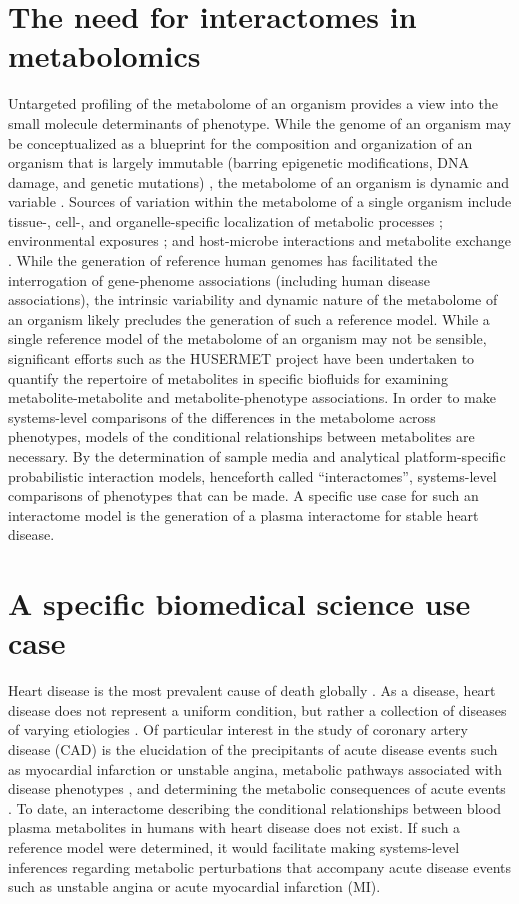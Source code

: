 \section{The need for interactomes in metabolomics}
Untargeted profiling of the metabolome of an organism provides a view into the small molecule determinants of phenotype. While the genome of an organism may be conceptualized as a blueprint for the composition and organization of an organism that is largely immutable (barring epigenetic modifications, DNA damage, and genetic mutations) \cite{gao2015,keating2015,martincorena2015}, the metabolome of an organism is dynamic and variable \cite{dallmann2012,krycer2017}. Sources of variation within the metabolome of a single organism include tissue-, cell-, and organelle-specific localization of metabolic processes \cite{shlomi2008,voet2013}; environmental exposures \cite{southam2014}; and host-microbe interactions and metabolite exchange \cite{moriya2017}. While the generation of reference human genomes has facilitated the interrogation of gene-phenome associations (including human disease associations), the intrinsic variability and dynamic nature of the metabolome of an organism likely precludes the generation of such a reference model. While a single reference model of the metabolome of an organism may not be sensible, significant efforts such as the HUSERMET project \cite{dunn2014} have been undertaken to quantify the repertoire of metabolites in specific biofluids for examining metabolite-metabolite and metabolite-phenotype associations. In order to make systems-level comparisons of the differences in the metabolome across phenotypes, models of the conditional relationships between metabolites are necessary. By the determination of sample media and analytical platform-specific probabilistic interaction models, henceforth called ``interactomes'', systems-level comparisons of phenotypes that can be made. A specific use case for such an interactome model is the generation of a plasma interactome for stable heart disease.

\section{A specific biomedical science use case}
Heart disease is the most prevalent cause of death globally \cite{benjamin2017}. As a disease, heart disease does not represent a uniform condition, but rather a collection of diseases of varying etiologies \cite{kasper2015}. Of particular interest in the study of coronary artery disease (CAD) is the elucidation of the precipitants of acute disease events such as myocardial infarction \cite{arbab2015} or unstable angina, metabolic pathways associated with disease phenotypes \cite{fan2016}, and determining the metabolic consequences of acute events \cite{trainor2017}. To date, an interactome describing the conditional relationships between blood plasma metabolites in humans with heart disease does not exist. If such a reference model were determined, it would facilitate making systems-level inferences regarding metabolic perturbations that accompany acute disease events such as unstable angina or acute myocardial infarction (MI).

